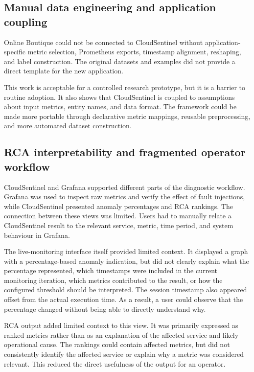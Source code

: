 \subsection{Manual data engineering and application coupling}
Online Boutique could not be connected to CloudSentinel without application-specific metric selection, Prometheus exports, timestamp alignment, reshaping, and label construction. The original datasets and examples did not provide a direct template for the new application.

This work is acceptable for a controlled research prototype, but it is a barrier to routine adoption. It also shows that CloudSentinel is coupled to assumptions about input metrics, entity names, and data format. The framework could be made more portable through declarative metric mappings, reusable preprocessing, and more automated dataset construction.

\subsection{RCA interpretability and fragmented operator workflow}
CloudSentinel and Grafana supported different parts of the diagnostic workflow. Grafana was used to inspect raw metrics and verify the effect of fault injections, while CloudSentinel presented anomaly percentages and RCA rankings. The connection between these views was limited. Users had to manually relate a CloudSentinel result to the relevant service, metric, time period, and system behaviour in Grafana.

The live-monitoring interface itself provided limited context. It displayed a graph with a percentage-based anomaly indication, but did not clearly explain what the percentage represented, which timestamps were included in the current monitoring iteration, which metrics contributed to the result, or how the configured threshold should be interpreted. The session timestamp also appeared offset from the actual execution time. As a result, a user could observe that the percentage changed without being able to directly understand why.

RCA output added limited context to this view. It was primarily expressed as ranked metrics rather than as an explanation of the affected service and likely operational cause. The rankings could contain affected metrics, but did not consistently identify the affected service or explain why a metric was considered relevant. This reduced the direct usefulness of the output for an operator.

